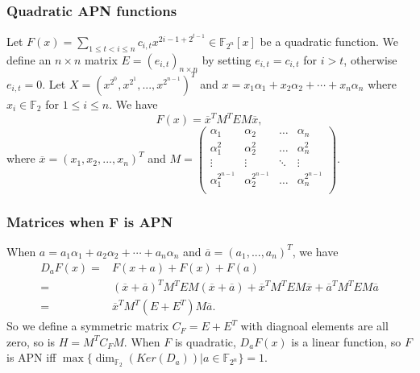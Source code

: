 \documentclass[
    aspectratio=169,                   %
]{beamer}
\newcommand{\F}{\mathbb{F}}
\begin{document}
    \begin{frame}
        \frametitle{Quadratic APN functions}
    
        Let $ F(x)=\sum_{1\le t< i\le n}c_{i,t}x^{2{i-1}+2^{t-1}}\in\F_{2^n}[x] $ be a quadratic function. 
        We define an $ n\times n $ matrix $ E=(e_{i,t})_{n\times n} $ by setting $ e_{i,t}=c_{i,t} $
        for $ i>t $, otherwise $ e_{i,t}=0 $.
        Let $ X=(x^{2^0},x^{2^1},...,x^{2^{n-1}})^T $ and $ x=x_1\alpha_1+x_2\alpha_2+\cdots+x_n\alpha_n $
        where $ x_i\in\F_2 $ for $ 1\le i\le n $. We have 
        \begin{equation}
            F(x)=\overline{x}^TM^TEM\overline{x}, 
        \end{equation}
        where $ \overline{x}=(x_1,x_2,...,x_n)^T $ and 
        $ M=\begin{pmatrix}
            \alpha_1   &\alpha_2   &\dots  &\alpha_n   \\
            \alpha_1^2& \alpha_2^2& \dots & \alpha_n^2\\
            \vdots    & \vdots    & \ddots& \vdots    \\
            \alpha_1^{2^{n-1}} &\alpha_2^{2^{n-1}} &\dots & \alpha_n^{2^{n-1}}\\
        \end{pmatrix}. $

    \end{frame}

    \begin{frame}
        \frametitle{Matrices when F is APN}
        When $ a=a_1\alpha_1+a_2\alpha_2+\cdots +a_n\alpha_n $ and $ \overline{a}=(a_1,...,a_n)^T $, we have 
        \begin{align*}
            D_aF(x)=&F(x+a)+F(x)+F(a)\\
                = &(\overline{x} + \overline{a})^T M^T E M(\overline{x} + \overline{a}) + \overline{x}^T M^T E M\overline{x} + \overline{a}^T M^T E M\overline{a}\\       
                =&\overline{x}^T M^T (E+E^T) M\overline{a}.
        \end{align*}
        So we define a symmetric matrix $ C_F=E+E^T $ with diagnoal elements are all zero, so is $ H=M^TC_FM $.
        When $ F $ is quadratic, $ D_aF(x) $ is a linear function, so $ F $ is APN iff $ \max\{\operatorname{dim}_{\F_2}(Ker(D_a))|a\in \F_{2^n}\}=1 $.
    \end{frame}
    
\end{document}
